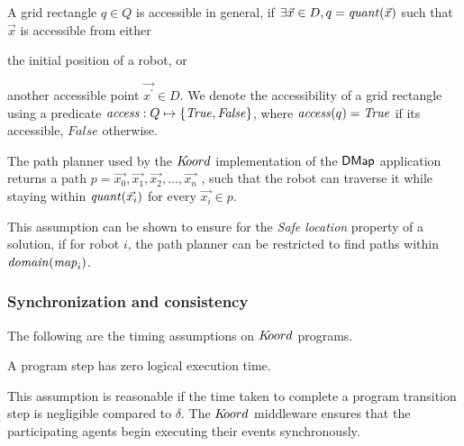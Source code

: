 A grid rectangle $q\in Q$ is accessible in general, if $\exists \Vec{x}\in D, q = \mathit{quant}(\Vec{x})$ such that $\Vec{x}$ is accessible from either \begin{inparaenum} [(a)] \item the initial position of a robot, or \item another accessible point $\Vec{x^\prime}\in D$. We denote the accessibility of a grid rectangle using a predicate $\mathit{access} : Q \mapsto \left\{\mathit{True}, \mathit{False}\right\}$, where $\mathit{access}(q) = \mathit{True}$ if its accessible,  $\mathit{False}$ otherwise.
\end{inparaenum}

\begin{assumption}
    The path planner used by the $K\kern-2pt oord$ implementation of the ${\sf DMap}$ application returns a path $p = \Vec{x_0},\Vec{x_1}, \Vec{x_2},\ldots, \Vec{x_n}$ , such that the robot can traverse it while staying within $\mathit{quant}(\Vec{x_i})$ for every $\Vec{x_i}\in p$.
\end{assumption}

This assumption can be shown to ensure for the \emph{Safe location} property of a solution, if for robot $i$, the path planner can be restricted to find paths within $\mathit{domain}(\mathit{map}_i)$.




\subsubsection{Synchronization and consistency}
The following are the timing assumptions on $K\kern-2pt oord$ programs.
\begin{assumption} A program step has zero logical execution time.
\end{assumption}
This assumption is reasonable if the time taken to complete a program transition step is negligible compared to $\delta$.  The $K\kern-2pt oord$ middleware ensures that the participating agents begin executing their events synchronously.

